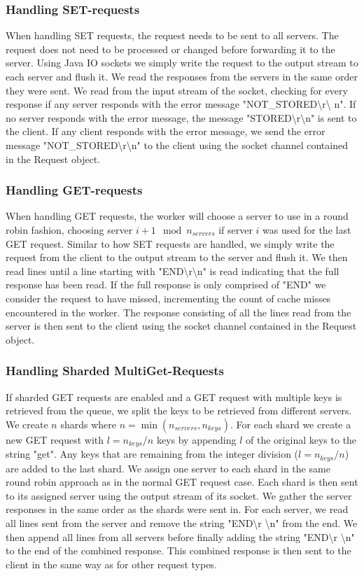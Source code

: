 \documentclass[11pt,a4paper]{article}
\begin{document}
\subsubsection{Handling SET-requests}
When handling SET requests, the request needs to be sent to all servers. The request does not need to be processed or changed before forwarding it to the server. Using Java IO sockets we simply write the request to the output stream to each server and flush it. We read the responses from the servers in the same order they were sent. We read from the input stream of the socket, checking for every response if any server responds with the error message "NOT\_STORED\textbackslash r\textbackslash
n". If no server responds with the error message, the message "STORED\textbackslash r\textbackslash n" is sent to the client. If any client responds with the error message, we send the error message "NOT\_STORED\textbackslash r\textbackslash n" to the client using the socket channel contained in the Request object.

\subsubsection{Handling GET-requests}
When handling GET requests, the worker will choose a server to use in a round robin fashion, choosing server $i+1 \mod n_{servers}$ if server $i$ was used for the last GET request. Similar to how SET requests are handled, we simply write the request from the client to the output stream to the server and flush it. We then read lines until a line starting with "END\textbackslash r\textbackslash n" is read indicating that the full response has been read. If the full response is only comprised of "END" we consider the request to have missed, incrementing the count of cache misses encountered in the worker. The response consisting of all the lines read from the server is then sent to the client using the socket channel contained in the Request object.

\subsubsection{Handling Sharded MultiGet-Requests}
If sharded GET requests are enabled and a GET request with multiple keys is retrieved from the queue, we split the keys to be retrieved from different servers. We create $n$ shards where $n = \min (n_{servers}, n_{keys})$. For each shard we create a new GET request with $l = n_{keys}/n$ keys by appending $l$ of the original keys to the string "get". Any keys that are remaining from the integer division ($l = n_{keys}/n$) are added to the last shard. We assign one server to each shard in the same round robin approach as in the normal GET request case. Each shard is then sent to its assigned server using the output stream of its socket. We gather the server responses in the same order as the shards were sent in. For each server, we read all lines sent from the server and remove the string "END\textbackslash r \textbackslash n" from the end. We then append all lines from all servers before finally adding the string "END\textbackslash r \textbackslash n" to the end of the combined response. This combined response is then sent to the client in the same way as for other request types.
\end{document}
